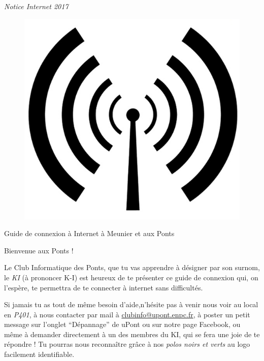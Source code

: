 \documentclass{../templates/enpc-ki/ki019}
\begin{document}
  \Header{}

  \begin{center}
    {\Huge \emph{Notice Internet 2017}}
  \end{center}

  \begin{figure}[H]
    \centering
    \includegraphics{page1}
  \end{figure}


  \begin{center}
    \Huge{Guide de connexion à Internet à Meunier et aux Ponts}
  \end{center}
  \thispagestyle{empty}
  \Footer


  \newpage


    Bienvenue aux Ponts !

    Le Club Informatique des Ponts, que tu vas apprendre à désigner par son surnom, le \emph{KI} (à prononcer K-I) est heureux de te présenter ce guide de connexion qui, on l'espère, te permettra de te connecter à internet sans difficultés.

    Si jamais tu as tout de même besoin d'aide,n'hésite pas à venir nous voir au local en \emph{P401}, à nous contacter par mail à \href{mailto:clubinfo@upont.enpc.fr}{clubinfo@upont.enpc.fr}, à poster un petit message sur l’onglet “Dépannage” de uPont ou sur notre page Facebook, ou même à demander directement à un des membres du KI, qui se fera une joie de te répondre ! Tu pourras nous reconnaître grâce à nos \emph{polos noirs et verts} au logo facilement identifiable.
\end{document}
